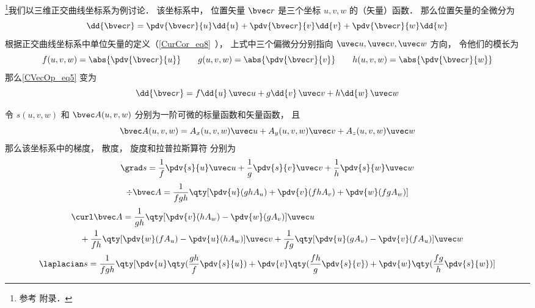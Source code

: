 

\footnote{参考 \cite{GriffE} 附录．}我们以三维正交曲线坐标系为例讨论． 该坐标系中， 位置矢量 $\bvec r$ 是三个坐标 $u, v, w$ 的（矢量）函数． 那么位置矢量的全微分为
\begin{equation}\label{CVecOp_eq5}
\dd{\bvec r} = \pdv{\bvec r}{u}\dd{u} + \pdv{\bvec r}{v}\dd{v} + \pdv{\bvec r}{w}\dd{w}
\end{equation}
根据正交曲线坐标系中单位矢量的定义（\autoref{CurCor_eq8}~）， 上式中三个偏微分分别指向 $\uvec u, \uvec v, \uvec w$ 方向， 令他们的模长为
\begin{equation}
f(u,v,w) = \abs{\pdv{\bvec r}{u}} \qquad
g(u,v,w) = \abs{\pdv{\bvec r}{v}} \qquad
h(u,v,w) = \abs{\pdv{\bvec r}{w}}
\end{equation}
那么\autoref{CVecOp_eq5} 变为
\begin{equation}\label{CVecOp_eq4}
\dd{\bvec r} = f\dd{u}\,\uvec u + g\dd{v}\,\uvec v + h\dd{w}\,\uvec w
\end{equation}


令 $s(u, v, w)$ 和 $\bvec A(u, v, w)$ 分别为一阶可微的标量函数和矢量函数， 且
\begin{equation}
\bvec A(u, v, w) = A_x(u, v, w)\uvec u + A_y(u, v, w)\uvec v + A_z(u, v, w)\uvec w
\end{equation}
那么该坐标系中的梯度， 散度， 旋度和拉普拉斯算符 分别为
\begin{equation}\label{CVecOp_eq1}
\grad s = \frac{1}{f} \pdv{s}{u}\uvec u + \frac{1}{g}\pdv{s}{v} \uvec v + \frac{1}{h} \pdv{s}{w}\uvec w
\end{equation}
\begin{equation}\label{CVecOp_eq2}
\div \bvec A = \frac{1}{fgh}\qty[\pdv{u}(ghA_u) + \pdv{v}(fhA_v) + \pdv{w}(fgA_w)]
\end{equation}
\begin{equation}\label{CVecOp_eq3}
\begin{aligned}
&\curl \bvec A = \frac{1}{gh}\qty[\pdv{v}(hA_w) - \pdv{w}(gA_v)]\uvec u\\
&\quad + \frac{1}{fh}\qty[\pdv{w}(fA_u) - \pdv{u}(hA_w)]\uvec v
+ \frac{1}{fg}\qty[\pdv{u}(gA_v) - \pdv{v}(fA_u)]\uvec w
\end{aligned}
\end{equation}
\begin{equation}\label{CVecOp_eq6}
\laplacian s = \frac{1}{fgh}\qty[\pdv{u}\qty(\frac{gh}{f}\pdv{s}{u}) + \pdv{v}\qty(\frac{fh}{g}\pdv{s}{v}) + \pdv{w}\qty(\frac{fg}{h}\pdv{s}{w})]
\end{equation}

